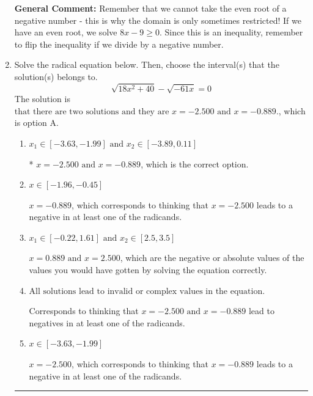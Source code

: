 \documentclass{extbook}[14pt]
\newcommand{\litem}[1]{\item #1

\rule{\textwidth}{0.4pt}}
\begin{document}
\begin{enumerate}
{\textbf{General Comment:} Remember that we cannot take the even root of a negative number - this is why the domain is only sometimes restricted! If we have an even root, we solve $8 x - 9 \geq 0$. Since this is an inequality, remember to flip the inequality if we divide by a negative number.
}
\litem{
Solve the radical equation below. Then, choose the interval(s) that the solution(s) belongs to.
\[ \sqrt{18 x^2 + 40} - \sqrt{-61 x} = 0 \]The solution is \( \text{that there are two solutions and they are } x = -2.500 \text{ and } x = -0.889. \), which is option A.\begin{enumerate}[label=\Alph*.]
\item \( x_1 \in [-3.63, -1.99] \text{ and } x_2 \in [-3.89,0.11] \)

* $x = -2.500 \text{ and } x = -0.889$, which is the correct option.
\item \( x \in [-1.96,-0.45] \)

$x = -0.889$, which corresponds to thinking that $x = -2.500$ leads to a negative in at least one of the radicands.
\item \( x_1 \in [-0.22, 1.61] \text{ and } x_2 \in [2.5,3.5] \)

$x = 0.889 \text{ and } x = 2.500$, which are the negative or absolute values of the values you would have gotten by solving the equation correctly.
\item \( \text{All solutions lead to invalid or complex values in the equation.} \)

Corresponds to thinking that $x = -2.500 \text{ and } x = -0.889$ lead to negatives in at least one of the radicands.
\item \( x \in [-3.63,-1.99] \)

$x = -2.500$, which corresponds to thinking that $x = -0.889$ leads to a negative in at least one of the radicands.
\end{enumerate}

}
\end{enumerate}
\end{document}
